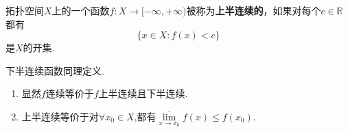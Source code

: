\documentclass[../../main.tex]{subfiles}%
\begin{document}
\begin{definition}[半连续函数定义]\label{definition:半连续函数定义}
拓扑空间\(X\)上的一个函数\(f:X\to[-\infty,+\infty)\)被称为\textbf{上半连续的}，如果对每个\(c\in\mathbb{R}\)都有
\[\{x\in X:f(x)<c\}\]
是\(X\)的开集.
\end{definition}
\begin{remark}
下半连续函数同理定义.
\end{remark}
\begin{note}
\begin{enumerate}[(1)]
\item 显然$f$连续等价于$f$上半连续且下半连续.
\item 上半连续等价于对$\forall x_0\in X$,都有$\underset{x\rightarrow x_0}{\overline{\lim }}f\left( x \right) \leqslant f\left( x_0 \right) $.
\end{enumerate}
\end{note}
\end{document}
